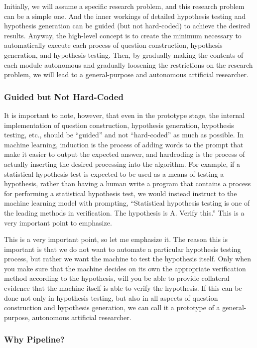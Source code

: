 Initially, we will assume a specific research problem, and this research problem can be a simple one. And the inner workings of detailed hypothesis testing and hypothesis generation can be guided (but not hard-coded) to achieve the desired results. Anyway, the high-level concept is to create the minimum necessary to automatically execute each process of question construction, hypothesis generation, and hypothesis testing. Then, by gradually making the contents of each module autonomous and gradually loosening the restrictions on the research problem, we will lead to a general-purpose and autonomous artificial researcher.

\subsubsection{Guided but Not Hard-Coded}

It is important to note, however, that even in the prototype stage, the internal implementation of question construction, hypothesis generation, hypothesis testing, etc., should be ``guided'' and not ``hard-coded'' as much as possible. In machine learning, induction is the process of adding words to the prompt that make it easier to output the expected answer, and hardcoding is the process of actually inserting the desired processing into the algorithm. For example, if a statistical hypothesis test is expected to be used as a means of testing a hypothesis, rather than having a human write a program that contains a process for performing a statistical hypothesis test, we would instead instruct to the machine learning model with prompting, ``Statistical hypothesis testing is one of the leading methods in verification. The hypothesis is A. Verify this.'' This is a very important point to emphasize.

This is a very important point, so let me emphasize it. The reason this is important is that we do not want to automate a particular hypothesis testing process, but rather we want the machine to test the hypothesis itself. Only when you make sure that the machine decides on its own the appropriate verification method according to the hypothesis, will you be able to provide collateral evidence that the machine itself is able to verify the hypothesis. If this can be done not only in hypothesis testing, but also in all aspects of question construction and hypothesis generation, we can call it a prototype of a general-purpose, autonomous artificial researcher.

\subsubsection{Why Pipeline?}

